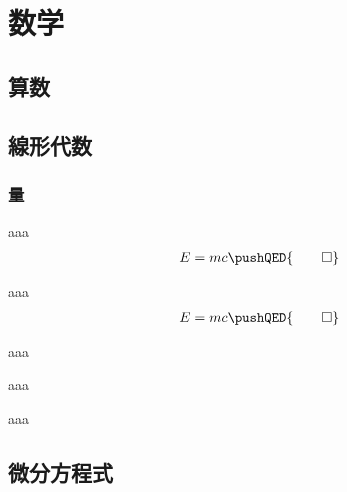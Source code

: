 \part{数学} %
\label{prt:数学}
\chapter*{算数} %
\label{cha:算数}


\chapter{線形代数} %
\label{cha:線形代数}
\section{量} %
\label{sec:量}
\begin{dfn}
    aaa
    \begin{align}
        E = mc \pushQED{\qed}
    \end{align}
\end{dfn}
\begin{theo}
    aaa
    \begin{align}
        E = mc \pushQED{\qed}
    \end{align}
\end{theo}
\begin{prop}
    aaa
\end{prop}
\begin{lemma}
    aaa
\end{lemma}
\begin{cor}
    aaa
\end{cor}

\chapter{微分方程式} %
\label{cha:微分方程式}
